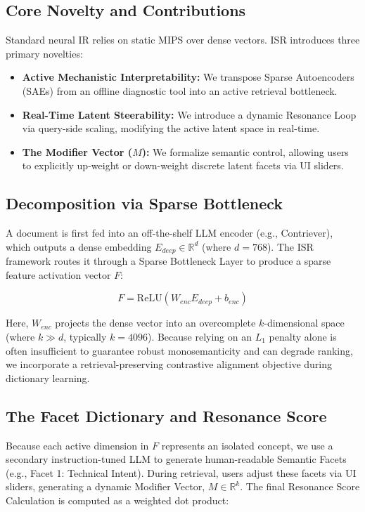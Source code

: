 \documentclass[sigconf,authordraft]{acmart}
\begin{document}
\subsection{Core Novelty and Contributions}
Standard neural IR relies on static MIPS over dense vectors. ISR introduces three primary novelties:
\begin{itemize}
    \item \textbf{Active Mechanistic Interpretability:} We transpose Sparse Autoencoders (SAEs) from an offline diagnostic tool into an active retrieval bottleneck.
    \item \textbf{Real-Time Latent Steerability:} We introduce a dynamic Resonance Loop via query-side scaling, modifying the active latent space in real-time.
    \item \textbf{The Modifier Vector ($M$):} We formalize semantic control, allowing users to explicitly up-weight or down-weight discrete latent facets via UI sliders.
\end{itemize}

\subsection{Decomposition via Sparse Bottleneck}
A document is first fed into an off-the-shelf LLM encoder (e.g., Contriever), which outputs a dense embedding $E_{deep} \in \mathbb{R}^d$ (where $d=768$). The ISR framework routes it through a Sparse Bottleneck Layer to produce a sparse feature activation vector $F$:

\begin{equation}
F = \text{ReLU}(W_{enc}E_{deep} + b_{enc})
\end{equation}

Here, $W_{enc}$ projects the dense vector into an overcomplete $k$-dimensional space (where $k \gg d$, typically $k=4096$). Because relying on an $L_1$ penalty alone is often insufficient to guarantee robust monosemanticity and can degrade ranking, we incorporate a retrieval-preserving contrastive alignment objective during dictionary learning.

\subsection{The Facet Dictionary and Resonance Score}
Because each active dimension in $F$ represents an isolated concept, we use a secondary instruction-tuned LLM to generate human-readable Semantic Facets (e.g., Facet 1: Technical Intent). During retrieval, users adjust these facets via UI sliders, generating a dynamic Modifier Vector, $M \in \mathbb{R}^k$. The final Resonance Score Calculation is computed as a weighted dot product:
\end{document}
